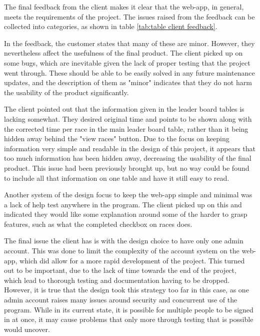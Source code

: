 \documentclass{l4proj}
\begin{document}
The final feedback from the client makes it clear that the web-app, in general, meets the requirements of the project. The issues raised from the feedback can be collected into categories, as shown in table \ref{tab:table client feedback}. 

In the feedback, the customer states that many of these are minor. However, they nevertheless affect the usefulness of the final product. The client picked up on some bugs, which are inevitable given the lack of proper testing that the project went through. These should be able to be easily solved in any future maintenance updates, and the description of them as "minor" indicates that they do not harm the usability of the product significantly.

The client pointed out that the information given in the leader board tables is lacking somewhat. They desired original time and points to be shown along with the corrected time per race in the main leader board table, rather than it being hidden away behind the "view races" button. Due to the focus on keeping information very simple and readable in the design of this project, it appears that too much information has been hidden away, decreasing the usability of the final product. This issue had been previously brought up, but no way could be found to include all that information on one table and have it still easy to read.

Another system of the design focus to keep the web-app simple and minimal was a lack of help test anywhere in the program. The client picked up on this and indicated they would like some explanation around some of the harder to grasp features, such as what the completed checkbox on races does.

The final issue the client has is with the design choice to have only one admin account. This was done to limit the complexity of the account system on the web-app, which did allow for a more rapid development of the project. This turned out to be important, due to the lack of time towards the end of the project, which lead to thorough testing and documentation having to be dropped. However, it is true that the design took this strategy too far in this case, as one admin account raises many issues around security and concurrent use of the program. While in its current state, it is possible for multiple people to be signed in at once, it may cause problems that only more through testing that is possible would uncover.
\end{document}
